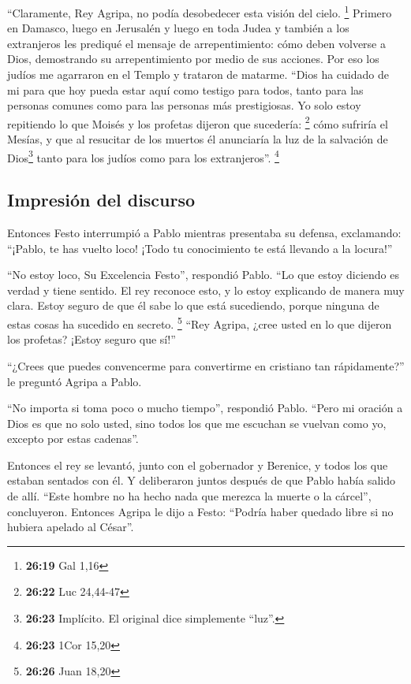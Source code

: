  ``Claramente, Rey Agripa, no podía desobedecer esta
visión del cielo. \footnote{\textbf{26:19} Gal 1,16} 
Primero en Damasco, luego en Jerusalén y luego en toda Judea y también a
los extranjeros les prediqué el mensaje de arrepentimiento: cómo deben
volverse a Dios, demostrando su arrepentimiento por medio de sus
acciones.  Por eso los judíos me agarraron en el Templo y
trataron de matarme.  ``Dios ha cuidado de mi para que
hoy pueda estar aquí como testigo para todos, tanto para las personas
comunes como para las personas más prestigiosas. Yo solo estoy
repitiendo lo que Moisés y los profetas dijeron que sucedería:
\footnote{\textbf{26:22} Luc 24,44-47}  cómo sufriría el
Mesías, y que al resucitar de los muertos él anunciaría la luz de la
salvación de Dios\footnote{\textbf{26:23} Implícito. El original dice
  simplemente ``luz''.} tanto para los judíos como para los
extranjeros''. \footnote{\textbf{26:23} 1Cor 15,20}

\hypertarget{impresiuxf3n-del-discurso}{%
\subsection{Impresión del discurso}\label{impresiuxf3n-del-discurso}}

 Entonces Festo interrumpió a Pablo mientras presentaba
su defensa, exclamando: ``¡Pablo, te has vuelto loco! ¡Todo tu
conocimiento te está llevando a la locura!''

 ``No estoy loco, Su Excelencia Festo'', respondió Pablo.
``Lo que estoy diciendo es verdad y tiene sentido.  El
rey reconoce esto, y lo estoy explicando de manera muy clara. Estoy
seguro de que él sabe lo que está sucediendo, porque ninguna de estas
cosas ha sucedido en secreto. \footnote{\textbf{26:26} Juan 18,20}
 ``Rey Agripa, ¿cree usted en lo que dijeron los
profetas? ¡Estoy seguro que sí!''

 ``¿Crees que puedes convencerme para convertirme en
cristiano tan rápidamente?'' le preguntó Agripa a Pablo.

 ``No importa si toma poco o mucho tiempo'', respondió
Pablo. ``Pero mi oración a Dios es que no solo usted, sino todos los que
me escuchan se vuelvan como yo, excepto por estas cadenas''.

 Entonces el rey se levantó, junto con el gobernador y
Berenice, y todos los que estaban sentados con él.  Y
deliberaron juntos después de que Pablo había salido de allí. ``Este
hombre no ha hecho nada que merezca la muerte o la cárcel'',
concluyeron.  Entonces Agripa le dijo a Festo: ``Podría
haber quedado libre si no hubiera apelado al César''.

